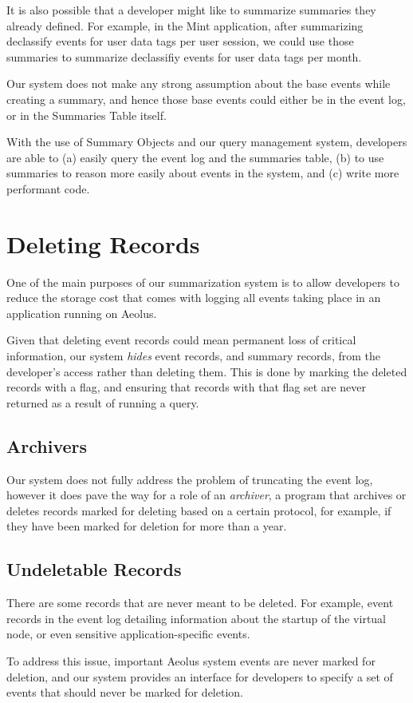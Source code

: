 It is also possible that a developer might like to summarize summaries they already defined. For example, in the Mint application, after summarizing declassify events for user data tags per user session, we could use those summaries to summarize declassifiy events for user data tags per month.

Our system does not make any strong assumption about the base events while creating a summary, and hence those base events could either be in the event log, or in the Summaries Table itself.

With the use of Summary Objects and our query management system, developers are able to (a) easily query the event log and the summaries table, (b) to use summaries to reason more easily about events in the system, and (c) write more performant code.

\section{Deleting Records}

One of the main purposes of our summarization system is to allow developers to reduce the storage cost that comes with logging all events taking place in an application running on Aeolus.

Given that deleting event records could mean permanent loss of critical information, our system \emph{hides} event records, and summary records, from the developer's access rather than deleting them. This is done by marking the deleted records with a flag, and ensuring that records with that flag set are never returned as a result of running a query.

\subsection{Archivers}

Our system does not fully address the problem of truncating the event log, however it does pave the way for a role of an \emph{archiver}, a program that archives or deletes records marked for deleting based on a certain protocol, for example, if they have been marked for deletion for more than a year.

\subsection{Undeletable Records}

There are some records that are never meant to be deleted. For example, event records in the event log detailing information about the startup of the virtual node, or even sensitive application-specific events.

To address this issue, important Aeolus system events are never marked for deletion, and our system provides an interface for developers to specify a set of events that should never be marked for deletion.
